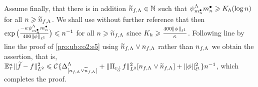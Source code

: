 \begin{pro}
Assume finally, that there is in addition
$\widetilde{\ssY}_{\xdf,\iSv}\in\Nz$ such that
$\cmiSv[\sDi{\ssY}]\sDi{\ssY}\geq K_{\ydf}(\log\ssY)$ for all
$\ssY\geq\widetilde{\ssY}_{\xdf,\iSv}$. We shall use without further
reference that then $\exp\big(\tfrac{-\cpen\cmSv[\sDi{\ssY}]\sDi{\ssY}}{400\Vnormlp[1]{\fydf}}\big)\leq\ssY^{-1}$ for
all $\ssY\geq\widetilde{\ssY}_{\xdf,\iSv}$ since $K_{\ydf}\geq
\tfrac{400\Vnormlp[1]{\fydf}}{\cpen}$. Following line by line the
proof of \eqref{pro:ub:co2:e5} using
$\widetilde{\ssY}_{\xdf,\iSv}\vee\ssY_{\xdf,\iSv}$  rather than
$\ssY_{\xdf,\iSv}$  we obtain the
assertion, that is,
$\FuEx[\ssY]{\rY}\VnormLp{\txdf-\xdf}^2
\leq\cst{}\{\DipenSv[{[\ssY_{\xdf,\iSv}\vee\widetilde{\ssY}_{\xdf,\iSv}]}]+\VnormLp{\Proj[{\mHiH[0]^\perp}]\xdf}^2[\ssY_{\xdf,\iSv}\vee\widetilde{\ssY}_{\xdf,\iSv}]+ \Vnormlp[1]{\fydf}^2\}\ssY^{-1}$, which completes the proof.\proEnd\end{pro}

